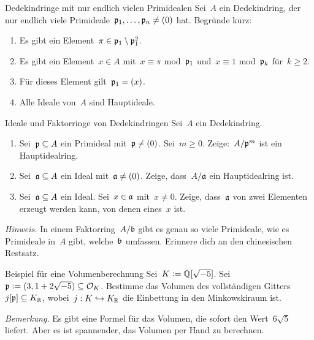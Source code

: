 \documentclass{uebblatt}
\begin{document}

\begin{aufgabe}{Dedekindringe mit nur endlich vielen Primidealen}
Sei~$A$ ein Dedekindring, der nur endlich viele
Primideale~$\mathfrak{p}_1,\ldots,\mathfrak{p}_n \neq (0)$ hat. Begründe kurz:
\begin{enumerate}
\item Es gibt ein Element~$\pi \in \mathfrak{p}_1 \setminus \mathfrak{p}_1^2$.
\item Es gibt ein Element~$x \in A$ mit~$x \equiv \pi$
mod~$\mathfrak{p}_1$ und~$x \equiv 1$ mod~$\mathfrak{p}_k$ für~$k \geq 2$.
\item Für dieses Element gilt~$\mathfrak{p}_1 = (x)$.
\item Alle Ideale von~$A$ sind Hauptideale.
\end{enumerate}
\end{aufgabe}

\begin{aufgabe}{Ideale und Faktorringe von Dedekindringen}
Sei~$A$ ein Dedekindring.
\begin{enumerate}
\item Sei~$\mathfrak{p} \subseteq A$ ein Primideal mit~$\mathfrak{p} \neq (0)$. Sei~$m \geq 0$.
Zeige:~$A/\mathfrak{p}^m$ ist ein Hauptidealring.
\item Sei~$\mathfrak{a} \subseteq A$ ein Ideal mit~$\mathfrak{a} \neq (0)$. Zeige, dass~$A/\mathfrak{a}$ ein
Hauptidealring ist.
\item Sei~$\mathfrak{a} \subseteq A$ ein Ideal. Sei~$x \in \mathfrak{a}$ mit~$x \neq 0$. Zeige,
dass~$\mathfrak{a}$ von zwei Elementen erzeugt werden kann, von denen eines~$x$ ist.
\end{enumerate}
{\tiny\emph{Hinweis.} In einem Faktorring~$A/\mathfrak{b}$ gibt es genau so viele
Primideale, wie es Primideale in~$A$ gibt, welche~$\mathfrak{b}$ umfassen. Erinnere
dich an den chinesischen Restsatz.\par}
\end{aufgabe}

\begin{aufgabe}{Beispiel für eine Volumenberechnung}
Sei~$K \vcentcolon= \mathbb{Q}[\sqrt{-5}]$. Sei~$\mathfrak{p} \vcentcolon= (3, 1 + 2\sqrt{-5}) \subseteq
\mathcal{O}_K$. Bestimme das Volumen des vollständigen
Gitters~$j[\mathfrak{p}] \subseteq K_{\mathbb{R}}$, wobei~$j : K \hookrightarrow K_{\mathbb{R}}$ die
Einbettung in den Minkowskiraum ist.

{\tiny\emph{Bemerkung.} Es gibt eine Formel für das Volumen, die sofort den
Wert~$6 \sqrt{5}$ liefert. Aber es ist spannender, das Volumen per Hand zu
berechnen.\par}
\end{aufgabe}
\end{document}
